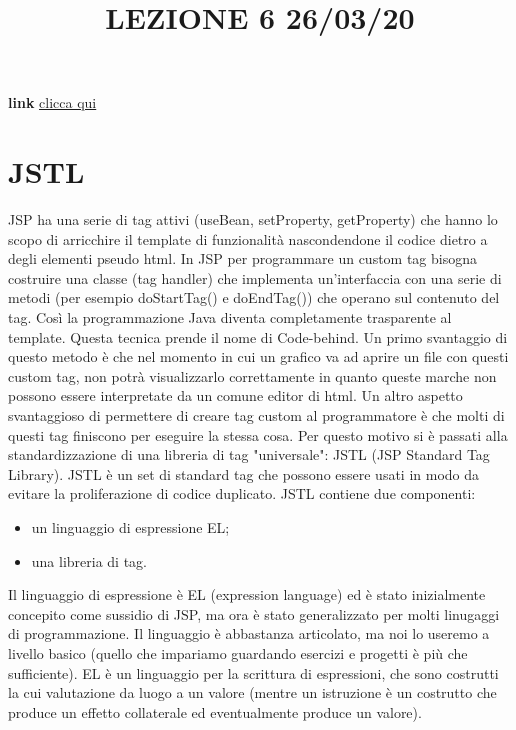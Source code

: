 \title{LEZIONE 6 26/03/20}\newline
\textbf{link} \href{https://web.microsoftstream.com/video/ee54067c-9686-4347-ba02-4b8a9715c174}{clicca qui}
\section{JSTL}
JSP ha una serie di tag attivi (useBean, setProperty, getProperty) che hanno lo scopo di arricchire il template di funzionalità nascondendone il codice dietro a degli elementi pseudo html. In JSP per programmare un custom tag bisogna costruire una classe (tag handler) che implementa un'interfaccia con una serie di metodi (per esempio doStartTag() e doEndTag()) che operano sul contenuto  del tag. Così la programmazione Java diventa completamente trasparente al template. Questa tecnica prende il nome di Code-behind.\newline
\newline
Un primo svantaggio di questo metodo è che nel momento in cui un grafico va ad aprire un file con questi custom tag, non potrà visualizzarlo correttamente in quanto queste marche non possono essere interpretate da un comune editor di html.\newline
Un altro aspetto svantaggioso di permettere di creare tag custom al programmatore è che molti di questi tag finiscono per eseguire la stessa cosa. Per questo motivo si è passati alla standardizzazione di una libreria di tag "universale": JSTL (JSP Standard Tag Library).\newline
\newline
JSTL è un set di standard tag che possono essere usati in modo da evitare la proliferazione di codice duplicato.\newline
\newline
JSTL contiene due componenti:
\begin{itemize}
    \item un linguaggio di espressione EL;
    \item una libreria di tag.
\end{itemize}
Il linguaggio di espressione è EL (expression language) ed è stato inizialmente concepito come sussidio di JSP, ma ora è stato generalizzato per molti linugaggi di programmazione. Il linguaggio è abbastanza articolato, ma noi lo useremo a livello basico (quello che impariamo guardando esercizi e progetti è più che sufficiente).\newline
EL è un linguaggio per la scrittura di espressioni, che sono costrutti la cui valutazione da luogo a un valore (mentre un istruzione è un costrutto che produce un effetto collaterale ed eventualmente produce un valore).\newline
